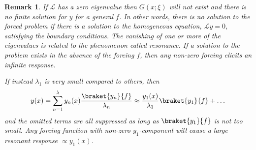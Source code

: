 \documentclass{article}
\theoremstyle{plain}\theoremheaderfont{\normalfont\itshape}\theorembodyfont{\rmfamily}\theoremseparator{.}\newtheorem*{rem}{Remark}\newtheorem*{ex}{Example}\newtheorem*{proof}{Proof}\newtheorem*{altp}{Alternative proof}
\theoremstyle{plain}\theoremheaderfont{\normalfont\bfseries}\theorembodyfont{\rmfamily}\theoremseparator{.}\newtheorem{thm}{Theorem}[section]\newtheorem{lem}[thm]{Lemma}\newtheorem{prop}[thm]{Proposition}\newtheorem*{cor}{Corollary}\newtheorem{defn}[thm]{Definition}\newtheorem{clm}[thm]{Claim}\newtheorem{clminproof}{Claim}
\theoremstyle{break}\theoremheaderfont{\normalfont\itshape}\theorembodyfont{\rmfamily}\theoremseparator{.\medskip}\newtheorem*{proofskip}{Proof}\newtheorem*{exs}{Examples}\newtheorem*{rems}{Remarks}
\theoremstyle{break}\theoremheaderfont{\normalfont\bfseries}\theorembodyfont{\rmfamily}\theoremseparator{.\medskip}\newtheorem{lemskip}[thm]{Lemma}\newtheorem{defnskip}[thm]{Definition}\newtheorem{propskip}[thm]{Proposition}\newtheorem{thmskip}[thm]{Theorem}
\numberwithin{equation}{section}
\begin{document}
	\begin{rem}
		If \(\mathcal{L}\) has a zero eigenvalue then \(G(x;\xi)\) will not exist and there is no finite solution for \(y\) for a general \(f\). In other words, there is no solution to the forced problem if there is a solution to the homogeneous equation, \(\mathcal{L}y=0\), satisfying the boundary conditions. The vanishing of one or more of the eigenvalues is related to the phenomenon called \textit{resonance}. If a solution to the problem exists in the absence of the forcing \(f\), then any non-zero forcing elicits an infinite response.
		
		If instead \(\lambda_1\) is very small compared to others, then
		\[y(x)=\sum_{n=1}^{\lambda}y_n(x)\frac{\braket{y_n}{f}}{\lambda_n}\approx \frac{y_1(x)}{\lambda_1}\braket{y_1}{f}+\dots\]
		and the omitted terms are all suppressed as long as \(\braket{y_1}{f}\) is not too small. Any forcing function with non-zero \(y_1\)-component will cause a large resonant response \(\propto y_1(x)\).
	\end{rem}
	
\end{document}
